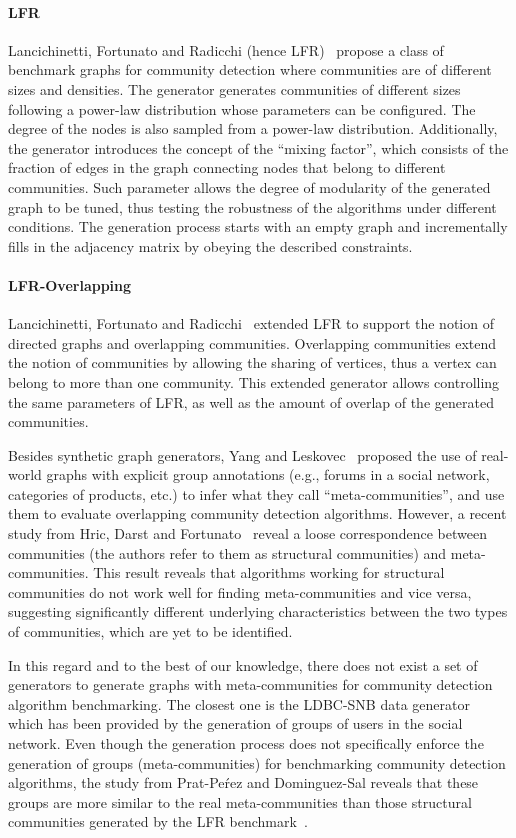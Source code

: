 \paragraph{LFR} Lancichinetti, Fortunato
and Radicchi (hence LFR)~\cite{PhysRevE.78.046110} propose a class of benchmark
graphs for community detection where communities are of different sizes and
densities. The generator generates communities of different sizes following a
power-law distribution whose parameters can be configured. The degree of the
nodes is also sampled from a power-law distribution. Additionally, the generator
introduces the concept of the ``mixing factor'', which consists of the fraction of
edges in the graph connecting nodes that belong to different communities. Such parameter
allows  the degree of modularity of the generated graph  to be tuned, thus
testing the robustness of the algorithms under different conditions. The
generation process starts with an empty graph and incrementally fills in the
adjacency matrix by obeying the described constraints. 

\paragraph{LFR-Overlapping} Lancichinetti, Fortunato and
Radicchi~\cite{PhysRevE.80.016118} extended LFR to support the notion of
directed graphs and overlapping communities. Overlapping communities extend the
notion of communities by allowing the sharing of vertices, thus a vertex can
belong to more than one community. This extended generator allows controlling
the same parameters of LFR, as well as the amount of overlap of
the generated communities.

Besides synthetic graph generators, Yang and Leskovec~\cite{yang2015defining}
proposed the use of real-world graphs with explicit group annotations (e.g.,
forums in a social network, categories of products, etc.) to infer what they
call ``meta-communities'', and use them to evaluate overlapping community
detection algorithms. However, a recent study from Hric, Darst and
Fortunato~\cite{hric2014community} reveal a loose correspondence between
communities (the authors refer to them as structural communities) and
meta-communities.  This result reveals that  algorithms working for structural
communities do not work well for finding meta-communities and vice versa,
suggesting significantly different underlying characteristics
between the two types of communities, which are yet to be
identified.

In this regard and to the best of our knowledge, there does not exist a set of
generators to generate graphs with meta-communities for community detection
algorithm benchmarking. The closest one is the LDBC-SNB data
generator~\cite{Erling:2015:LSN:2723372.2742786} which has been provided by the
generation of groups of users in the social network. Even though the generation
process does not specifically enforce the generation of groups
(meta-communities) for benchmarking community detection algorithms, the study
from Prat-Pe\'rez and Dominguez-Sal reveals that these groups are more similar
to the real meta-communities than those structural communities generated by the
LFR benchmark~\cite{Prat-Perez:2014:CSS:2621934.2621942}.

